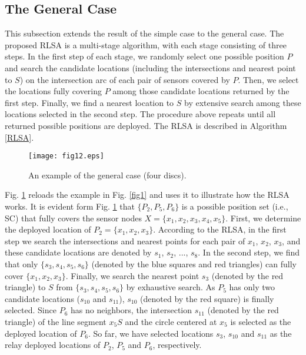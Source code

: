 \documentclass[journal]{IEEEtran}
\begin{document}
\subsection{The General Case}
This subsection extends the result of the simple case to the general case. The proposed RLSA is a multi-stage algorithm, with each stage consisting of three steps. In the first step of each stage, we randomly select one possible position $P$ and search the candidate locations (including the intersections and nearest point to $S$) on the intersection arc of each pair of sensors covered by $P$. Then, we select the locations fully covering $P$ among those candidate locations returned by the first step. Finally, we find a nearest location to $S$ by extensive search among these locations selected in the second step. The procedure above repeats until all returned possible positions are deployed. The RLSA is described in Algorithm \ref{RLSA}.


\begin{figure}
\begin{center}
\texttt{[image: fig12.eps]}    \caption{An example of the general case (four discs).}
\label{fig12}                                 \end{center}                                 \end{figure}

Fig. \ref{fig12} reloads the example in Fig. \ref{fig1} and uses it to illustrate how the RLSA works. It is evident form Fig. \ref{fig12} that $\{P_2, P_5, P_6\}$ is a possible position set (i.e., SC) that fully covers the sensor nodes $X=\{x_1, x_2, x_3, x_4, x_5\}$. First, we determine the deployed location of $P_2=\{x_1,x_2,x_3\}$. According to the RLSA, in the first step we search the intersections and nearest points for each pair of $x_1$, $x_2$, $x_3$, and these candidate locations are denoted by $s_1$, $s_2$, ..., $s_8$. In the second step, we find that only $\{s_3,s_4,s_5,s_6\}$ (denoted by the blue squares and red triangles) can fully cover $\{x_1, x_2, x_3\}$. Finally, we search the nearest point $s_3$ (denoted by the red triangle) to $S$ from $\{s_3,s_4,s_5,s_6\}$ by exhaustive search. As $P_5$ has only two candidate locations ($s_{10}$ and $s_{11}$), $s_{10}$ (denoted by the red square) is finally selected. Since $P_6$ has no neighbors, the intersection $s_{11}$ (denoted by the red triangle) of the line segment $x_5S$ and the circle centered at $x_5$ is selected as the deployed location of $P_6$. So far, we have selected locations $s_3$, $s_{10}$ and $s_{11}$ as the relay deployed locations of $P_2$, $P_5$ and $P_6$, respectively.
\end{document}
